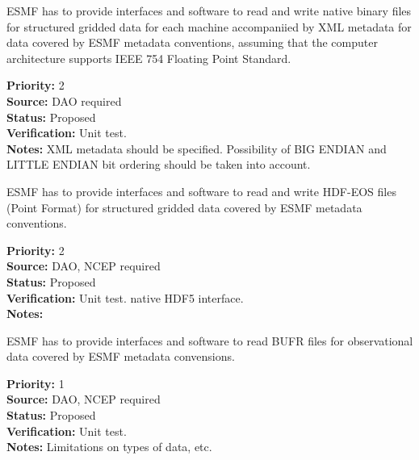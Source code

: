 
ESMF has to provide interfaces and software to read and write native
binary files for structured gridded data for each machine accompaniied
by XML metadata for data covered by ESMF metadata conventions,
assuming that the computer architecture supports IEEE 754 Floating
Point Standard. 

\begin{reqlist}
{\bf Priority:} 2 \\
{\bf Source:} DAO required \\
{\bf Status:} Proposed \\
{\bf Verification:} Unit test. \\
{\bf Notes:} XML metadata should be specified. Possibility of BIG
ENDIAN and LITTLE ENDIAN bit ordering should be taken into account.
\end{reqlist}



ESMF has to provide interfaces and software to read and write HDF-EOS
files (Point Format) for structured gridded data covered by ESMF metadata 
conventions. 

\begin{reqlist}
{\bf Priority:} 2 \\
{\bf Source:} DAO, NCEP required \\
{\bf Status:} Proposed \\
{\bf Verification:} Unit test. 
native HDF5 interface. \\
{\bf Notes:}
\end{reqlist}





ESMF has to provide interfaces and software to read BUFR files for
observational data covered by ESMF metadata convensions.

\begin{reqlist}
{\bf Priority:} 1 \\
{\bf Source:} DAO, NCEP required \\
{\bf Status:} Proposed \\
{\bf Verification:} Unit test. \\
{\bf Notes:} Limitations on types of data, etc.
\end{reqlist}

